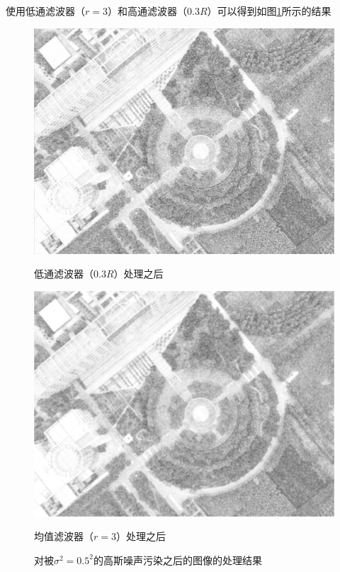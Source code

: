 使用低通滤波器（$r=3$）和高通滤波器（$0.3R$）可以得到如图\ref{fig:sigma50}所示的结果
\begin{figure}[H]
	\centering
	\begin{minipage}{0.45\linewidth}
		\includegraphics[width=\linewidth]{figure/DJI_0027_Processed_by_LP_50}
		\caption{低通滤波器（$0.3R$）处理之后}
	\end{minipage}
	\begin{minipage}{0.45\linewidth}
		\includegraphics[width=\linewidth]{figure/DJI_0027_Processed_by_MF_50}
		\caption{均值滤波器（$r=3$）处理之后}
	\end{minipage}
	\caption{对被$\sigma^2=0.5^2$的高斯噪声污染之后的图像的处理结果}
	\label{fig:sigma50}
\end{figure}
